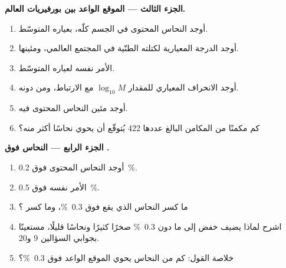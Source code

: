 \begin{problem}
\noindent\textbf{الجزء الثالث --- الموقع الواعد بين بورفيريات العالم.}
\begin{enumerate}[resume]
  \item أوجد النحاس المحتوى في الجسم كلّه، بعياره المتوسّط.
  \item أوجد الدرجة المعيارية لكتلته الطنّية في المجتمع العالمي، ومئينها.
  \item الأمر نفسه لعياره المتوسّط.
  \item أوجد الانحراف المعياري للمقدار $\log_{10} M$ مع الارتباط، ومن دونه.
  \item أوجد مئين النحاس المحتوى فيه.
  \item كم مكمنًا من المكامن البالغ عددها 422 يُتوقّع أن يحوي نحاسًا أكثر منه؟
\end{enumerate}

\noindent\textbf{الجزء الرابع --- النحاس فوق .}
\begin{enumerate}[resume]
  \item أوجد النحاس المحتوى فوق  \qty{0.2}{\percent}.
  \item الأمر نفسه فوق \qty{0.5}{\percent}.
  \item ما كسر النحاس الذي يقع فوق \qty{0.3}{\percent}، وما كسر
        ؟
  \item اشرح لماذا يضيف خفض  إلى ما دون \qty{0.3}{\percent} صخرًا كثيرًا ونحاسًا
        قليلًا، مستعينًا بجوابي السؤالين 9 و20.
  \item خلاصة القول: كم من النحاس يحوي الموقع الواعد فوق  \qty{0.3}{\percent}؟
\end{enumerate}
\end{problem}
